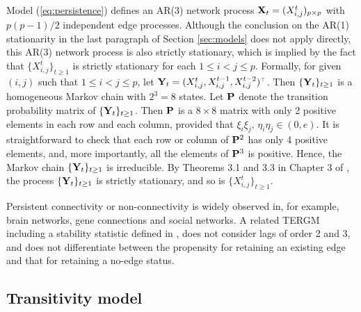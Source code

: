 \documentclass[12pt]{article}
\def\T{{\scriptscriptstyle \top} }
\newcommand{\bP}{{\bf P}}
\newcommand{\bX}{{\bf X}}
\newcommand{\bY}{{\bf Y}}
\newcommand{\0}{{\bf 0}}
\begin{document}
Model (\ref{eq:persistence}) defines an AR(3) network process $\bX_t = (X_{i,j}^t)_{p\times p}$ with $p(p-1)/2$ independent edge processes. Although the conclusion on the AR(1) stationarity in the last paragraph of Section \ref{sec:models} does not apply directly, this AR(3) network process is also strictly stationary, which is implied by the fact that $\{X_{i,j}^t\}_{t\ge 1}$ is strictly stationary for each $1\le i<j\le p$. Formally, for given $(i,j)$ such that $1\leq i<j\leq p$, let
$\bY_t = (X_{i,j}^t, X_{i,j}^{t-1}, X_{i,j}^{t-2})^\T$.
Then $\{\bY_t\}_{t\geq1}$ is a homogeneous Markov chain with $2^3 =8$ states. Let $\bP$ denote
the transition probability matrix of $\{\bY_t\}_{t\geq1}$. Then 
$\bP$ is a $8\times 8$ matrix with only 2 positive elements in each row and each column, provided that $\xi_i \xi_j, \, \eta_i \eta_j \in (0, e)$. It is straightforward to check that each row or column of $\bP^2 $ has only 4 positive elements, and, more importantly, all the elements of $\bP^3$ is positive. Hence, the Markov chain $\{\bY_t\}_{t\geq1}$ is irreducible. By Theorems 3.1 and 3.3 in Chapter 3 of \cite{bremaud1998},  the process $\{\bY_t\}_{t\geq1}$ is strictly stationary, and so is $\{X_{i,j}^t\}_{t\geq1}$.

Persistent connectivity or non-connectivity is widely observed in, for example, brain networks, gene connections and social networks. A related TERGM including  a stability statistic defined in \cite{hanneke2010}, does not consider lags of order 2 and 3, and does not differentiate between the propensity for retaining an existing edge and that for retaining a no-edge status.

\subsection{Transitivity model} \label{sec:transitivity}
\end{document}
